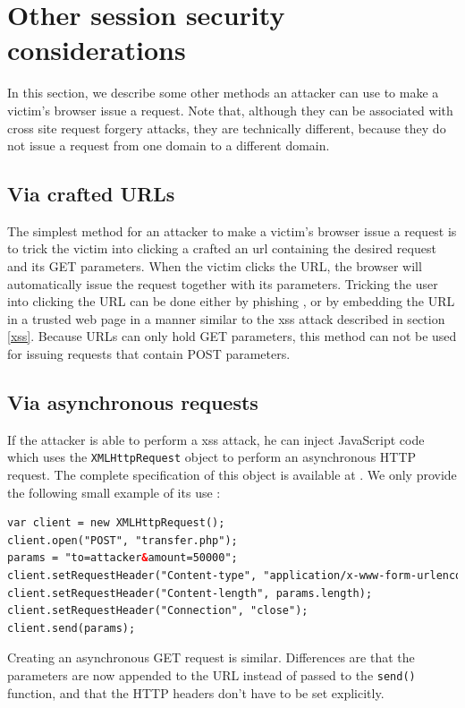 \section{Other session security considerations}\label{other-browser-requests}

In this section, we describe some other methods an attacker can use to make a victim's browser issue a request. Note that, although they can be associated with cross site request forgery attacks, they are technically different, because they do not issue a request from one domain to a different domain.

\subsection{Via crafted URLs}

The simplest method for an attacker to make a victim's browser issue a request is to trick the victim into clicking a crafted an \gls{url} containing the desired request and its GET parameters. When the victim clicks the URL, the browser will automatically issue the request together with its parameters. Tricking the user into clicking the URL can be done either by phishing \cite{Barth2008}, or by embedding the URL in a trusted web page in a manner similar to the \gls{xss} attack described in section \ref{xss}. Because URLs can only hold GET parameters, this method can not be used for issuing requests that contain POST parameters.

\subsection{Via asynchronous requests}\label{asynch}

If the attacker is able to perform a \gls{xss} attack, he can inject JavaScript code which uses the \texttt{XMLHttpRequest} object to perform an asynchronous HTTP request. The complete specification of this object is available at \cite{Kesteren:09:X}. We only provide the following small example of its use \cite{Binny2010}:
\begin{lstlisting}[language=HTML,breaklines=true]
var client = new XMLHttpRequest();
client.open("POST", "transfer.php");
params = "to=attacker&amount=50000";
client.setRequestHeader("Content-type", "application/x-www-form-urlencoded");
client.setRequestHeader("Content-length", params.length);
client.setRequestHeader("Connection", "close");
client.send(params);
\end{lstlisting}
Creating an asynchronous GET request is similar. Differences are that the parameters are now appended to the URL instead of passed to the \texttt{send()} function, and that the HTTP headers don't have to be set explicitly.

